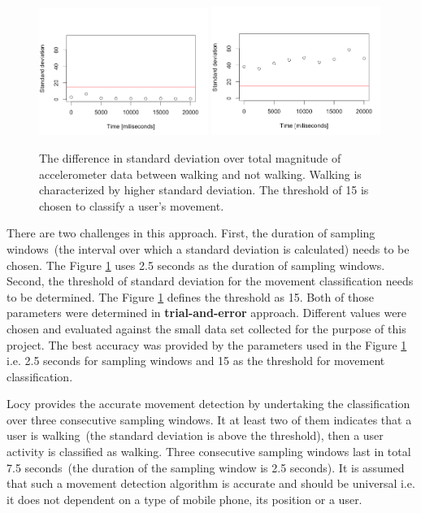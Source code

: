 \begin{figure}[H]
\centering
\includegraphics[width=0.49\textwidth, scale=0.6]{plots/stddev_no_walking}
\includegraphics[width=0.49\textwidth, scale=0.6]{plots/stddev_walking}
\caption{\label{p:moving:stddev} The difference in standard deviation over total magnitude of accelerometer data between walking and not walking. Walking is characterized by higher standard deviation. The threshold of 15 is chosen to classify a user's movement.}
\end{figure}

There are two challenges in this approach. First, the duration of sampling windows\ (the interval over which a standard deviation is calculated) needs to be chosen. The Figure \ref{p:moving:stddev} uses 2.5 seconds as the duration of sampling windows. Second, the threshold of standard deviation for the movement classification needs to be determined. The Figure \ref{p:moving:stddev} defines the threshold as 15. Both of those parameters were determined in \textbf{trial-and-error} approach. Different values were chosen and evaluated against the small data set collected for the purpose of this project. The best accuracy was provided by the parameters used in the Figure \ref{p:moving:stddev} i.e. 2.5 seconds for sampling windows and 15 as the threshold for movement classification. 

Locy provides the accurate movement detection by undertaking the classification over three consecutive sampling windows. It at least two of them indicates that a user is walking\ (the standard deviation is above the threshold), then a user activity is classified as walking. Three consecutive sampling windows last in total 7.5 seconds\ (the duration of the sampling window is 2.5 seconds). It is assumed that such a movement detection algorithm is accurate and should be universal i.e. it does not dependent on a type of mobile phone, its position or a user.

